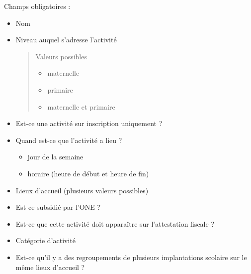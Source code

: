 \documentclass[letterpaper,10pt,english]{sphinxmanual}
\begin{document}
Champs obligatoires :
\begin{itemize}
\item {} 
Nom

\item {} 
Niveau auquel s'adresse l'activité
\begin{quote}

Valeurs possibles
\begin{itemize}
\item {} 
maternelle

\item {} 
primaire

\item {} 
maternelle et primaire

\end{itemize}
\end{quote}

\item {} 
Est-ce une activité sur inscription uniquement ?

\item {} 
Quand est-ce que l'activité a lieu ?
\begin{itemize}
\item {} 
jour de la semaine

\item {} 
horaire (heure de début et heure de fin)

\end{itemize}

\item {} 
Lieux d'accueil (plusieurs valeurs possibles)

\item {} 
Est-ce subsidié par l'ONE ?

\item {} 
Est-ce que cette activité doit apparaître sur l'attestation fiscale ?

\item {} 
Catégorie d'activité

\item {} 
Est-ce qu'il y a des regroupements de plusieurs implantations scolaire sur le même lieux d'accueil ?

\end{itemize}
\end{document}
